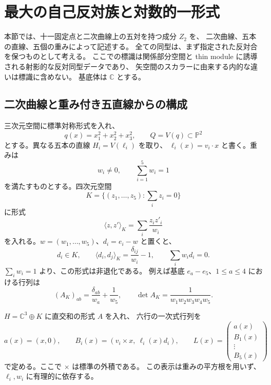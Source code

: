 \section{最大の自己反対族と対数的一形式}
\label{sec:master-normal-form-v25}

本節では、十一固定点と二次曲線上の五対を持つ成分 $Z_2$ を、
二次曲線、五本の直線、五個の重みによって記述する。
全ての同型は、まず指定された反対合を保つものとして考える。
ここでの標識は関係部分空間と thin module に誘導される射影的な反対同型データであり、
矢空間のスカラーに由来する内的な違いは標識に含めない。
基底体は $\mathbb C$ とする。

\subsection{二次曲線と重み付き五直線からの構成}

三次元空間に標準対称形式を入れ、
\[
 q(x)=x_1^2+x_2^2+x_3^2,\qquad Q=V(q)\subset\mathbb P^2
\]
とする。異なる五本の直線 $H_i=V(\ell_i)$ を取り、
$\ell_i(x)=v_i\cdot x$ と書く。重みは
\begin{equation}\label{eq:weights-v25}
 w_i\ne0,\qquad \sum_{i=1}^5w_i=1
\end{equation}
を満たすものとする。四次元空間
\[
 K=\{(z_1,\ldots,z_5):\textstyle\sum_i z_i=0\}
\]
に形式
\[
 \langle z,z'\rangle_K=\sum_i\frac{z_i z'_i}{w_i}
\]
を入れる。$w=(w_1,\ldots,w_5)$、$d_i=e_i-w$ と置くと、
\begin{equation}\label{eq:weighted-gram-v25}
 d_i\in K,\qquad
 \langle d_i,d_j\rangle_K=\frac{\delta_{ij}}{w_i}-1,
 \qquad\sum_iw_i d_i=0.
\end{equation}
$\sum_iw_i=1$ より、この形式は非退化である。
例えば基底 $e_a-e_5$、$1\le a\le4$ における行列は
\[
 (A_K)_{ab}=\frac{\delta_{ab}}{w_a}+\frac1{w_5},\qquad
 \det A_K=\frac1{w_1w_2w_3w_4w_5}.
\]

$H=\mathbb C^3\oplus K$ に直交和の形式 $A$ を入れ、
六行の一次式行列を
\begin{equation}\label{eq:master-normal-L-v25}
 a(x)=(x,0),\qquad
 B_i(x)=(v_i\times x,\ \ell_i(x)d_i),\qquad
 L(x)=\begin{pmatrix}a(x)\\B_1(x)\\\vdots\\B_5(x)\end{pmatrix}
\end{equation}
で定める。ここで $\times$ は標準の外積である。
この表示は重みの平方根を用いず、$\ell_i,w_i$ に有理的に依存する。

